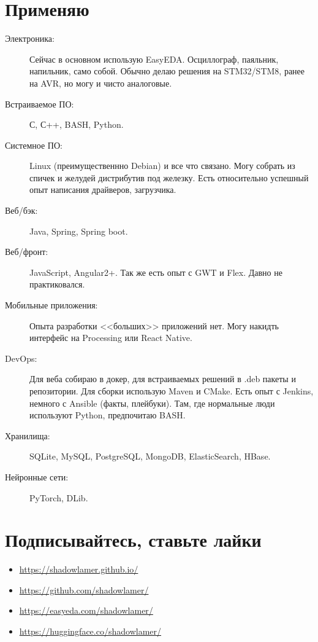 \documentclass [a4paper,10pt]{article}
\begin{document}
\section*{Применяю}
\begin{description}
\item[Электроника:]
	Сейчас в основном использую EasyEDA. Осциллограф, паяльник, напильник, само собой.
	Обычно делаю решения на STM32/STM8, ранее на AVR, но могу и чисто аналоговые.

\item[Встраиваемое ПО:]
	С, С++, BASH, Python.

\item[Системное ПО:]
	Linux (преимущественнно Debian) и все что связано. Могу собрать из спичек и желудей дистрибутив под железку.
	Есть относительно успешный опыт написания драйверов, загрузчика.

\item[Веб/бэк:]
	Java, Spring, Spring boot.

\item[Веб/фронт:]
	JavaScript, Angular2+. Так же есть опыт с GWT и Flex. Давно не практиковался.

\item[Мобильные приложения:]
	Опыта разработки <<больших>> приложений нет. Могу накидть интерфейс на Processing или React Native.

\item[DevOps:]
	Для веба собираю в докер, для встраиваемых решений в .deb пакеты и репозитории. Для сборки использую Maven и CMake.
	Есть опыт с Jenkins, немного с Ansible (факты, плейбуки). Там, где нормальные люди используют Python, предпочитаю BASH.

\item[{Хранилища}:]
	SQLite, MySQL, PostgreSQL, MongoDB, ElasticSearch, HBase.

\item[{Нейронные сети}:]
	PyTorch, DLib.
\end{description}

\section*{Подписывайтесь, ставьте лайки}
\begin{itemize}
\item\url{https://shadowlamer.github.io/}
\item\url{https://github.com/shadowlamer/}
\item\url{https://easyeda.com/shadowlamer/}
\item\url{https://huggingface.co/shadowlamer/}
\end{itemize}
	
\end{document}
